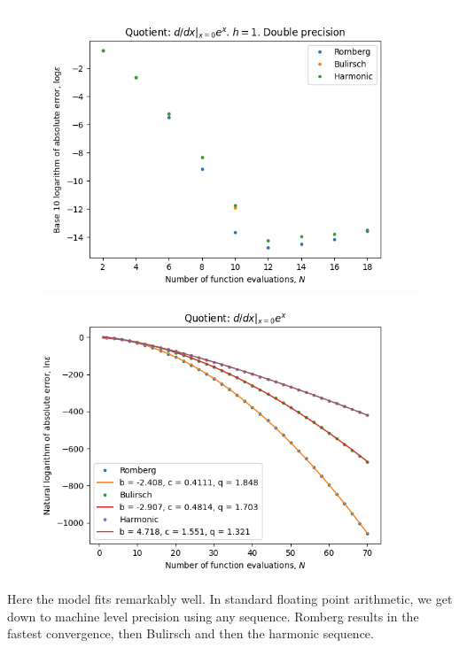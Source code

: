 \begin{figure}[H]
\centering
\begin{minipage}{0.45\textwidth}
\centering
\includegraphics[scale=0.45]{diff_quot_plots/exp_0.png}
\end{minipage}
\begin{minipage}{0.45\textwidth}
\centering
\includegraphics[scale=0.45]{diff_quot_plots/exp_0_hp_trend.png}
\end{minipage}
\end{figure}

Here the model fits remarkably well. In standard floating point arithmetic, we get down to machine level precision using any sequence. Romberg results in the fastest convergence, then Bulirsch and then the harmonic sequence.

